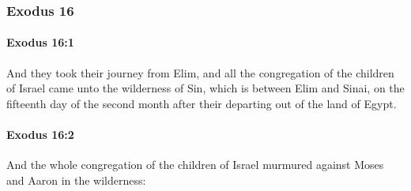 	\subsubsection{Exodus 16} %
		\label{EXODUS-16}

		\paragraph{Exodus 16:1} %
			\label{EXODUS-16-1}

			And they took their journey from Elim, and all the congregation of the children of Israel came unto the wilderness of Sin, which is between Elim and Sinai, on the fifteenth day of the second month after their departing out of the land of Egypt.


		\paragraph{Exodus 16:2} %
			\label{EXODUS-16-2}

			And the whole congregation of the children of Israel murmured against Moses and Aaron in the wilderness:

